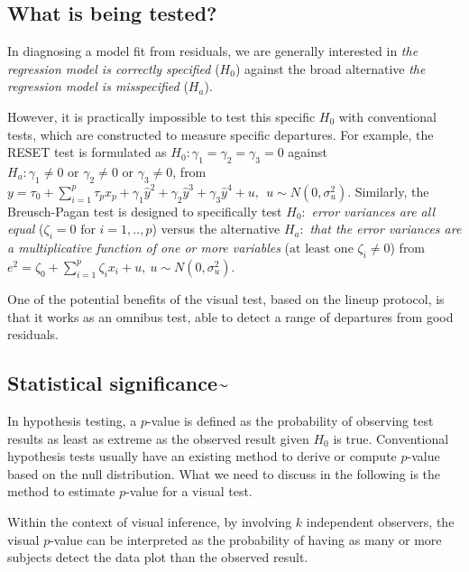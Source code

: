 \documentclass[]{interact}
\theoremstyle{plain}%
\theoremstyle{definition}
\theoremstyle{remark}
\begin{document}
\hypertarget{what-is-being-tested}{%
\subsection{What is being tested?}\label{what-is-being-tested}}

In diagnosing a model fit from residuals, we are generally interested in
\emph{the regression model is correctly specified} (\(H_0\)) against the
broad alternative \emph{the regression model is misspecified} (\(H_a\)).

However, it is practically impossible to test this specific \(H_0\) with
conventional tests, which are constructed to measure specific
departures. For example, the RESET test is formulated as
\(H_0:\gamma_1 = \gamma_2 = \gamma_3 = 0\) against
\(H_a: \gamma_1 \neq 0 \text{ or } \gamma_2 \neq 0 \text{ or } \gamma_3 \neq 0\),
from
\(y = \tau_0 + \sum_{i=1}^{p}\tau_px_p +\gamma_1\hat{y}^2 + \gamma_2\hat{y}^3 + \gamma_3\hat{y}^4 + u, ~~u \sim N(0, \sigma_u^2)\).
Similarly, the Breusch-Pagan test is designed to specifically test
\(H_0:\) \emph{error variances are all equal}
(\(\zeta_i=0 \text{ for } i=1,..,p\)) versus the alternative \(H_a:\)
\emph{that the error variances are a multiplicative function of one or
more variables} (\(\text{at least one } \zeta_i\neq 0\)) from
\(e^2 = \zeta_0 + \sum_{i=1}^{p}\zeta_i x_i + u, ~ u\sim N(0,\sigma_u^2)\).

One of the potential benefits of the visual test, based on the lineup
protocol, is that it works as an omnibus test, able to detect a range of
departures from good residuals.

\hypertarget{statistical-significance}{%
\subsection{\texorpdfstring{Statistical
significance\textasciitilde{}\label{sig}}{Statistical significance\textasciitilde{}}}\label{statistical-significance}}

In hypothesis testing, a \(p\)-value is defined as the probability of
observing test results as least as extreme as the observed result given
\(H_0\) is true. Conventional hypothesis tests usually have an existing
method to derive or compute \(p\)-value based on the null distribution.
What we need to discuss in the following is the method to estimate
\(p\)-value for a visual test.

Within the context of visual inference, by involving \(k\) independent
observers, the visual \(p\)-value can be interpreted as the probability
of having as many or more subjects detect the data plot than the
observed result.
\end{document}
